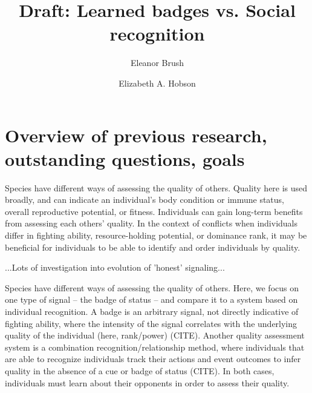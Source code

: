 

\noindent
\title{Draft: Learned badges vs. Social recognition} 

\author[1]{Eleanor Brush}
\author[2,3]{Elizabeth A. Hobson}
\maketitle

\section*{Overview of previous research, outstanding questions, goals} 

Species have different ways of assessing the quality of others. Quality here is used broadly, and can indicate an individual's body condition or immune status, overall reproductive potential, or fitness. Individuals can gain long-term benefits from assessing each others' quality. In the context of conflicts when individuals differ in fighting ability, resource-holding potential, or dominance rank, it may be beneficial for individuals to be able to identify and order individuals by quality. 

...Lots of investigation into evolution of 'honest' signaling...  



Species have different ways of assessing the quality of others. Here, we focus on one type of signal -- the badge of status -- and compare it to a system based on individual recognition. A badge is an arbitrary signal, not directly indicative of fighting ability, where the intensity of the signal correlates with the underlying quality of the individual (here, rank/power) (CITE). Another quality assessment system is a combination recognition/relationship method, where individuals that are able to recognize individuals track their actions and event outcomes to infer quality in the absence of a cue or badge of status (CITE). In both cases, individuals must learn about their opponents in order to assess their quality.

